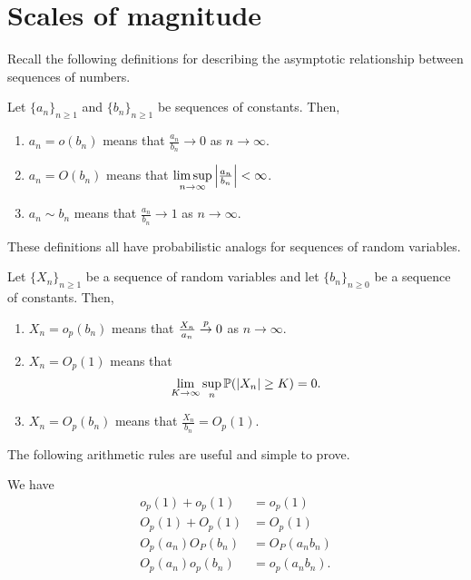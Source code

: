 \section{Scales of magnitude}
Recall the following definitions for describing the asymptotic relationship between sequences of numbers.
\begin{definition}
    Let $\{a_n\}_{n \ge 1}$ and $\{b_n\}_{n \ge 1}$ be sequences of constants. Then,
    \begin{enumerate}
        \item $a_n = o(b_n)$ means that $\frac{a_n}{b_n} \to 0$ as $n \to \infty$.
        \item $a_n = O(b_n)$  means that $\limsup\limits_{n \to \infty} {\left\lvert\frac{a_n}{b_n}\right\rvert} < \infty$.
        \item $a_n \sim b_n$ means that $\frac{a_n}{b_n} \to 1$ as $n \to \infty$.
    \end{enumerate}
\end{definition}
These definitions all have probabilistic analogs for sequences of random variables.
\begin{definition}
    Let $\{X_n\}_{n \ge 1}$  be a sequence of random variables and let $\{b_n\}_{n \ge 0}$ be a sequence of constants. Then,
    \begin{enumerate}
        \item $X_n = o_p(b_n)$ means that $\frac{X_n}{a_n} \stackrel{p}{\to} 0$ as $n \to \infty$.
        \item $X_n = O_p(1)$ means that \[\lim_{K \to \infty} \sup_{n}{\mathbb{P}}({\left\lvert X_n\right\rvert} \ge K) = 0.\]
        \item $X_n = O_p(b_n)$ means that $\frac{X_n}{b_n} = O_p(1)$.
    \end{enumerate}
\end{definition}
The following arithmetic rules are useful and simple to prove.
\begin{lemma}
    We have
    \begin{align*}
        o_p(1)+o_p(1)&=o_p(1)\\
        O_p(1)+O_p(1) &=O_p(1)\\
        O_p(a_n)O_P(b_n)&=O_P(a_nb_n)\\
        O_p(a_n)o_p(b_n)&=o_p(a_nb_n).
    \end{align*}
\end{lemma}
